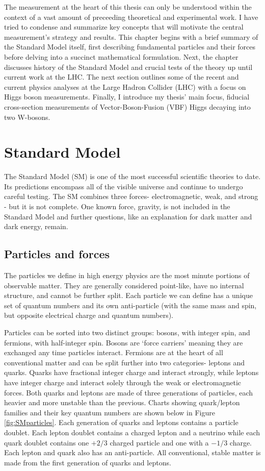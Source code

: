 The measurement at the heart of this thesis can only be understood within the context of a vast amount of preceeding theoretical and experimental work. I have tried to condense and summarize key concepts that will motivate the central measurement's strategy and results. This chapter begins with a brief summary of the Standard Model itself, first describing fundamental particles and their forces before delving into a succinct mathematical formulation. Next, the chapter discusses history of the Standard Model and crucial tests of the theory up until current work at the LHC. The next section outlines some of the recent and current physics analyses at the Large Hadron Collider (LHC) with a focus on Higgs boson measurements. Finally, I introduce my thesis' main focus, fiducial cross-section measurements of Vector-Boson-Fusion (VBF) Higgs decaying into two W-bosons.

\section{Standard Model}

The Standard Model (SM) is one of the most successful scientific theories to date. Its predictions encompass all of the visible universe and continue to undergo careful testing. The SM combines three forces- electromagnetic, weak, and strong - but it is not complete. One known force, gravity, is not included in the Standard Model and further questions, like an explanation for dark matter and dark energy, remain. 

\subsection{Particles and forces}
The particles we define in high energy physics are the most minute portions of observable matter. They are generally considered point-like, have no internal structure, and cannot be further split. Each particle we can define has a unique set of quantum numbers and its own anti-particle (with the same mass and spin, but opposite electrical charge and quantum numbers).

Particles can be sorted into two distinct groups: bosons, with integer spin, and fermions, with half-integer spin. Bosons are `force carriers' meaning they are exchanged any time particles interact. Fermions are at the heart of all conventional matter and can be split further into two categories- leptons and quarks. Quarks have fractional integer charge and interact strongly, while leptons have integer charge and interact solely through the weak or electromagnetic forces. Both quarks and leptons are made of three generations of particles, each heavier and more unstable than the previous. Charts showing quark/lepton families and their key quantum numbers are shown below in Figure \ref{fig:SMparticles}. Each generation of quarks and leptons contains a particle doublet. Each lepton doublet contains a charged lepton and a neutrino while each quark doublet contains one $+2/3$ charged particle and one with a $-1/3$ charge. Each lepton and quark also has an anti-particle. All conventional, stable matter is made from the first generation of quarks and leptons.

